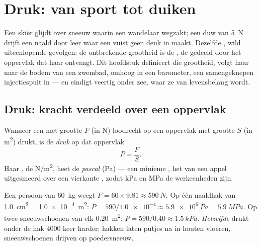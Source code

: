 \chapter{Druk: van sport tot duiken}\label{ch:g10:pressure}

Een skiër glijdt over sneeuw waarin een wandelaar wegzakt; een duw van
\qty{5}{N} drijft een naald door leer waar een vuist geen deuk in maakt.
Dezelfde , wild uiteenlopende gevolgen: de ontbrekende grootheid
is de \emph{}, de  gedeeld door het oppervlak dat haar
ontvangt. Dit hoofdstuk definieert die grootheid, volgt haar naar de
bodem van een zwembad, omhoog in een barometer, een samengeknepen
injectiespuit in --- en eindigt veertig  onder zee, waar ze van
levensbelang wordt.

\section{Druk: kracht verdeeld over een oppervlak}

\begin{definition}[Druk]\label{def:g10:pressure:pressure}
Wanneer een  met grootte $F$ (in \unit{N}) loodrecht op een
oppervlak met grootte $S$ (in \unit{m^2}) drukt, is de
\emph{druk} op dat oppervlak
\[
P = \frac{F}{S}.
\]
Haar , de \unit{N/m^2}, heet de \emph{pascal}
(\unit{Pa}) --- een minieme , het  van een appel
uitgesmeerd over een vierkante , zodat \unit{kPa} en \unit{MPa} de
werkeenheden zijn.
\end{definition}

\begin{example}\label{ex:g10:pressure:snowshoe}
Een persoon van \qty{60}{kg} weegt $F = 60 \times 9.81 \approx
\qty{590}{N}$. Op één naaldhak van \qty{1.0}{cm^2} = \qty{1.0e-4}{m^2}:
$P = 590/\num{1.0e-4} \approx \qty{5.9e6}{Pa} = \qty{5.9}{MPa}$. Op twee
sneeuwschoenen van elk \qty{0.20}{m^2}:
$P = 590/0.40 \approx \qty{1.5}{kPa}$. \emph{Hetzelfde}  drukt
onder de hak $4000$ keer harder: hakken laten putjes na in houten
vloeren, sneeuwschoenen drijven op poedersneeuw.
\end{example}

